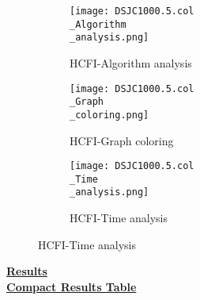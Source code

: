 \documentclass[10pt]{article}
\begin{document}
\begin{figure}[H]
\begin{subfigure}{.33\textwidth}
  \centering
  \texttt{[image: DSJC1000.5.col\\\_Algorithm\\\_analysis.png]}
  \caption{HCFI-Algorithm analysis}
   \label{fig:subfig1}
\end{subfigure}%
\begin{subfigure}{.33\textwidth}
  \centering
  \texttt{[image: DSJC1000.5.col\\\_Graph\\\_coloring.png]}
  \caption{HCFI-Graph coloring}
  \label{fig:subfig2}
\end{subfigure}
\begin{subfigure}{.33\textwidth}
  \centering
  \texttt{[image: DSJC1000.5.col\\\_Time\\\_analysis.png]}
  \caption{HCFI-Time analysis}
  \end{subfigure}
\end{figure}
\vspace{2cm}
\begin{center}
\hyperlink{page.8}{\textbf{Results}}\\
\vspace{0.5cm}
\hyperlink{page.71}{\textbf{Compact Results Table}}
\end{center}
\pagebreak
\end{document}
